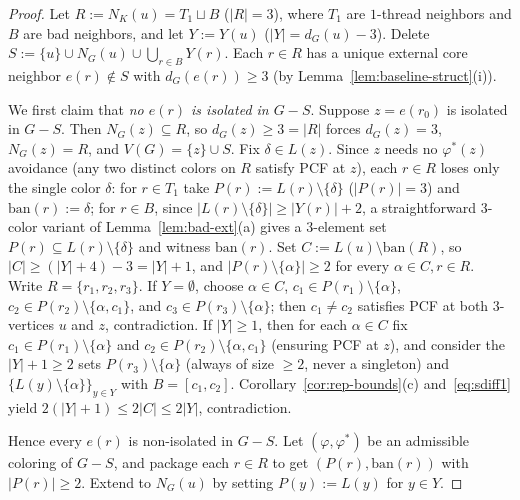 \documentclass[11pt,a4paper]{article}
\theoremstyle{definition}
\begin{document}
\begin{proof}
Let $R := N_K(u) = T_1 \sqcup B$ ($|R| = 3$), where $T_1$ are $1$-thread neighbors and $B$ are bad neighbors, and let $Y := Y(u)$ ($|Y| = d_G(u) - 3$). Delete $S := \{u\} \cup N_G(u) \cup \bigcup_{r \in B} Y(r)$. Each $r \in R$ has a unique external core neighbor $e(r) \notin S$ with $d_G(e(r)) \ge 3$ (by Lemma~\ref{lem:baseline-struct}(i)).

We first claim that \emph{no $e(r)$ is isolated in $G - S$}. Suppose $z = e(r_0)$ is isolated in $G - S$. Then $N_G(z) \subseteq R$, so $d_G(z) \ge 3 = |R|$ forces $d_G(z) = 3$, $N_G(z) = R$, and $V(G) = \{z\} \cup S$. Fix $\delta \in L(z)$. Since $z$ needs no $\varphi^*(z)$ avoidance (any two distinct colors on $R$ satisfy PCF at $z$), each $r \in R$ loses only the single color $\delta$: for $r \in T_1$ take $P(r) := L(r) \setminus \{\delta\}$ ($|P(r)| = 3$) and $\mathrm{ban}(r) := \delta$; for $r \in B$, since $|L(r) \setminus \{\delta\}| \ge |Y(r)| + 2$, a straightforward $3$-color variant of Lemma~\ref{lem:bad-ext}(a) gives a $3$-element set $P(r) \subseteq L(r) \setminus \{\delta\}$ and witness $\mathrm{ban}(r)$. Set $C := L(u) \setminus \mathrm{ban}(R)$, so $|C| \ge (|Y|+4) - 3 = |Y| + 1$, and $|P(r) \setminus \{\alpha\}| \ge 2$ for every $\alpha \in C, r \in R$. Write $R = \{r_1, r_2, r_3\}$. If $Y = \emptyset$, choose $\alpha \in C$, $c_1 \in P(r_1) \setminus \{\alpha\}$, $c_2 \in P(r_2) \setminus \{\alpha, c_1\}$, and $c_3 \in P(r_3) \setminus \{\alpha\}$; then $c_1 \neq c_2$ satisfies PCF at both $3$-vertices $u$ and $z$, contradiction. If $|Y| \ge 1$, then for each $\alpha \in C$ fix $c_1 \in P(r_1) \setminus \{\alpha\}$ and $c_2 \in P(r_2) \setminus \{\alpha, c_1\}$ (ensuring PCF at $z$), and consider the $|Y|+1 \ge 2$ sets $P(r_3) \setminus \{\alpha\}$ (always of size $\ge 2$, never a singleton) and $\{L(y) \setminus \{\alpha\}\}_{y \in Y}$ with $B = [c_1, c_2]$. Corollary~\ref{cor:rep-bounds}(c) and~\eqref{eq:sdiff1} yield $2(|Y|+1) \le 2|C| \le 2|Y|$, contradiction.

Hence every $e(r)$ is non-isolated in $G - S$. Let $(\varphi, \varphi^*)$ be an admissible coloring of $G - S$, and package each $r \in R$ to get $(P(r), \mathrm{ban}(r))$ with $|P(r)| \ge 2$. Extend to $N_G(u)$ by setting $P(y) := L(y)$ for $y \in Y$.


\end{proof}
\end{document}
